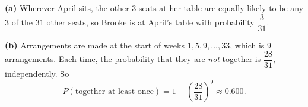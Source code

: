 \textbf{(a)} Wherever April sits, the other $3$ seats at her table are equally likely to be any $3$ of the $31$ other seats, so Brooke is at April's table with probability $\boxed{\dfrac{3}{31}}$.

\textbf{(b)} Arrangements are made at the start of weeks $1,5,9,\dots,33$, which is $9$ arrangements. Each time, the probability that they are \emph{not} together is $\dfrac{28}{31}$, independently. So
\[
P(\text{together at least once})=\boxed{1-\left(\dfrac{28}{31}\right)^9}\approx0.600 .
\]
